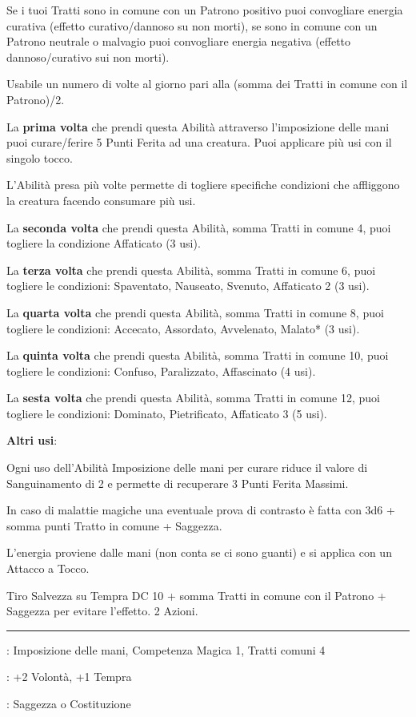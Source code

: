 \begin{multicols}{2}
Se i tuoi Tratti sono in comune con un Patrono positivo puoi convogliare energia curativa (effetto curativo/dannoso su non morti), se sono in comune con un Patrono neutrale o malvagio puoi convogliare energia negativa (effetto dannoso/curativo sui non morti).

Usabile un numero di volte al giorno pari alla (somma dei Tratti in comune con il Patrono)/2.

La \textbf{prima volta} che prendi questa Abilità attraverso l'imposizione delle mani puoi curare/ferire 5 Punti Ferita ad una creatura. Puoi applicare più usi con il singolo tocco.

L'Abilità presa più volte permette di togliere specifiche condizioni che affliggono la creatura facendo consumare più usi.

La \textbf{seconda volta} che prendi questa Abilità, somma Tratti in comune 4, puoi togliere la condizione Affaticato (3 usi).

La \textbf{terza volta} che prendi questa Abilità, somma Tratti in comune 6, puoi togliere le condizioni: Spaventato, Nauseato, Svenuto, Affaticato 2 (3 usi).


La \textbf{quarta volta} che prendi questa Abilità, somma Tratti in comune 8, puoi togliere le condizioni: Accecato, Assordato, Avvelenato, Malato* (3 usi).

La \textbf{quinta volta} che prendi questa Abilità, somma Tratti in comune 10, puoi togliere le condizioni: Confuso, Paralizzato, Affascinato (4 usi).

La \textbf{sesta volta} che prendi questa Abilità, somma Tratti in comune 12, puoi togliere le condizioni: Dominato, Pietrificato, Affaticato 3 (5 usi).


\textbf{Altri usi}:

\smallskip


Ogni uso dell'Abilità Imposizione delle mani per curare riduce il valore di Sanguinamento di 2 e permette di recuperare 3 Punti Ferita Massimi.

In caso di malattie magiche una eventuale prova di contrasto è fatta con 3d6 + somma punti Tratto in comune + Saggezza.

L'energia proviene dalle mani (non conta se ci sono guanti) e si applica con un Attacco a Tocco.

Tiro Salvezza su Tempra DC 10 + somma Tratti in comune con il Patrono + Saggezza per evitare l'effetto. 2 Azioni.

\smallskip\noindent\rule{\linewidth}{2pt} \hypertarget{Incanalare Energia}{}\medskip{}
\noindent
\begin{description}[noitemsep, topsep=0pt, parsep=0pt, partopsep=0pt, leftmargin=0cm, labelwidth=2.5cm]
    \item[\textbf{Requisito}]: Imposizione delle mani, Competenza Magica 1, Tratti comuni 4
    \item[\textbf{Tiri Salvezza}]: +2 Volontà, +1 Tempra
    \item[\textbf{Caratteristica}]: Saggezza o Costituzione
\end{description}


\end{multicols}
